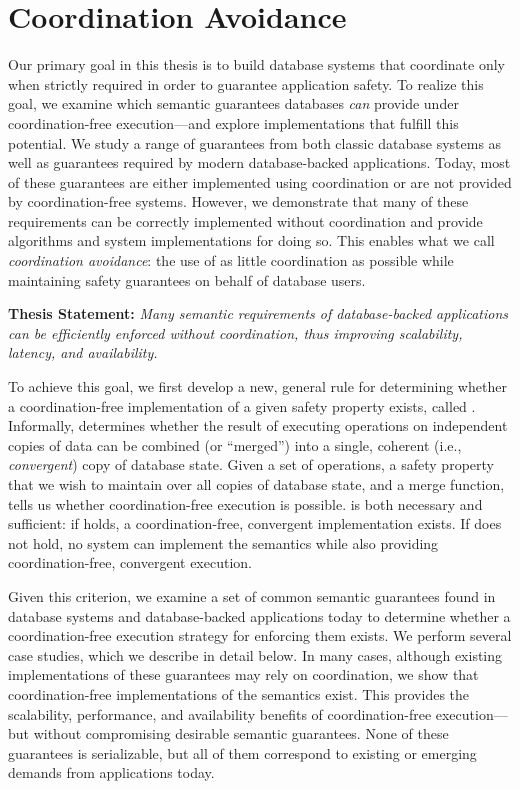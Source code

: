 \section{Coordination Avoidance}

Our primary goal in this thesis is to build database systems that
coordinate only when strictly required in order to guarantee
application safety. To realize this goal, we examine which semantic
guarantees databases \textit{can} provide under coordination-free
execution---and explore implementations that fulfill this
potential. We study a range of guarantees from both classic database
systems as well as guarantees required by modern database-backed
applications. Today, most of these guarantees are either implemented
using coordination or are not provided by coordination-free
systems. However, we demonstrate that many of these requirements can
be correctly implemented without coordination and provide algorithms
and system implementations for doing so. This enables what we call
\textit{coordination avoidance}: the use of as little coordination as
possible while maintaining safety guarantees on behalf of database
users.

\vspace{0.5em}
\noindent\textbf{Thesis Statement:} \textit{Many semantic requirements
  of database-backed applications can be efficiently enforced without
  coordination, thus improving scalability, latency, and
  availability.}

To achieve this goal, we first develop a new, general rule for
determining whether a coordination-free implementation of a given
safety property exists, called \textit{\iconfluence}. Informally,
\iconfluence determines whether the result of executing operations on
independent copies of data can be combined (or ``merged'') into a
single, coherent (i.e., \textit{convergent}) copy of database
state. Given a set of operations, a safety property that we wish to
maintain over all copies of database state, and a merge function,
\iconfluence tells us whether coordination-free execution is
possible. \Iconfluence is both necessary and sufficient: if
\iconfluence holds, a coordination-free, convergent implementation
exists. If \iconfluence does not hold, no system can implement the
semantics while also providing coordination-free, convergent
execution.

Given this \iconfluence criterion, we examine a set of common semantic
guarantees found in database systems and database-backed applications
today to determine whether a coordination-free execution strategy for
enforcing them exists. We perform several case studies, which we
describe in detail below. In many cases, although existing
implementations of these guarantees may rely on coordination, we show
that coordination-free implementations of the semantics exist. This
provides the scalability, performance, and availability benefits of
coordination-free execution---but without compromising desirable
semantic guarantees. None of these guarantees is serializable, but all
of them correspond to existing or emerging demands from
applications today.

